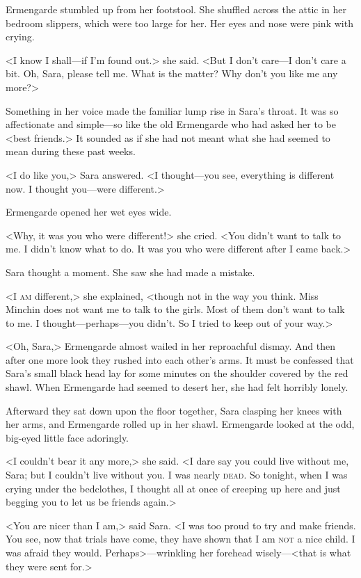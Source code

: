Ermengarde stumbled up from her footstool. She shuffled across the attic in her bedroom slippers, which were too large for her. Her eyes and nose were pink with crying.

<I know I shall—if I'm found out.> she said. <But I don't care—I don't care a bit. Oh, Sara, please tell me. What is the matter? Why don't you like me any more?>

Something in her voice made the familiar lump rise in Sara's throat. It was so affectionate and simple—so like the old Ermengarde who had asked her to be <best friends.> It sounded as if she had not meant what she had seemed to mean during these past weeks.

<I do like you,> Sara answered. <I thought—you see, everything is different now. I thought you—were different.>

Ermengarde opened her wet eyes wide.

<Why, it was you who were different!> she cried. <You didn't want to talk to me. I didn't know what to do. It was you who were different after I came back.>

Sara thought a moment. She saw she had made a mistake.

<I \textsc{am} different,> she explained, <though not in the way you think. Miss Minchin does not want me to talk to the girls. Most of them don't want to talk to me. I thought—perhaps—you didn't. So I tried to keep out of your way.>

<Oh, Sara,> Ermengarde almost wailed in her reproachful dismay. And then after one more look they rushed into each other's arms. It must be confessed that Sara's small black head lay for some minutes on the shoulder covered by the red shawl. When Ermengarde had seemed to desert her, she had felt horribly lonely.

Afterward they sat down upon the floor together, Sara clasping her knees with her arms, and Ermengarde rolled up in her shawl. Ermengarde looked at the odd, big-eyed little face adoringly.

<I couldn't bear it any more,> she said. <I dare say you could live without me, Sara; but I couldn't live without you. I was nearly \textsc{dead}. So tonight, when I was crying under the bedclothes, I thought all at once of creeping up here and just begging you to let us be friends again.>

<You are nicer than I am,> said Sara. <I was too proud to try and make friends. You see, now that trials have come, they have shown that I am \textsc{not} a nice child. I was afraid they would. Perhaps>—wrinkling her forehead wisely—<that is what they were sent for.>

